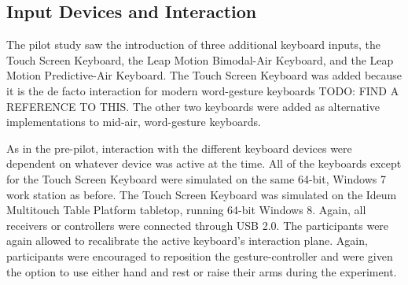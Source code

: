 \begin{table}[h]
	\centering
	\caption[Schedule of Assessments]{\centering Details of Participants.}
	\label{pre_participant_stats}
\end{table}

\subsection{Input Devices and Interaction}

The pilot study saw the introduction of three additional keyboard inputs, the Touch Screen Keyboard, the Leap Motion Bimodal-Air Keyboard, and the Leap Motion Predictive-Air Keyboard. The Touch Screen Keyboard was added because it is the de facto interaction for modern word-gesture keyboards TODO: FIND A REFERENCE TO THIS. The other two keyboards were added as alternative implementations to mid-air, word-gesture keyboards.

As in the pre-pilot, interaction with the different keyboard devices were dependent on whatever device was active at the time. All of the keyboards except for the Touch Screen Keyboard were simulated on the same 64-bit, Windows 7 work station as before. The Touch Screen Keyboard was simulated on the Ideum Multitouch Table Platform tabletop, running 64-bit Windows 8. Again, all receivers or controllers were connected through USB 2.0. The participants were again allowed to recalibrate the active keyboard's interaction plane. Again, participants were encouraged to reposition the gesture-controller and were given the option to use either hand and rest or raise their arms during the experiment.

